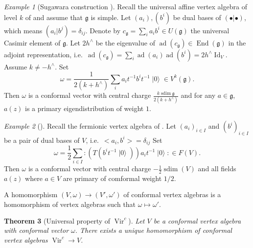 \documentclass[a4paper, 12pt, reqno]{amsart}
\newtheorem{theorem}{Theorem}[subsection]
\theoremstyle{remark}
\newtheorem{example}[theorem]{Example}
\numberwithin{equation}{subsection}
\DeclareMathOperator{\Vir}{Vir}
\DeclareMathOperator{\Id}{Id}
\DeclareMathOperator{\End}{End}
\DeclareMathOperator{\vac}{|0\rangle}
\DeclareMathOperator{\ad}{ad}
\DeclareMathOperator{\sdim}{sdim}
\begin{document}
\begin{example}[Sugawara construction {\cite[Theorem 5.7]{kac_vertex_1998}}]
  \label{exa:9}
  Recall the universal affine vertex algebra of level $k$ of  and assume that $\mathfrak{g}$ is simple.
  Let $(a_i), (b^i)$ be dual bases of $(\bullet| \bullet)$, which means $(a_i| b^j) = \delta_{ij}$.
  Denote by $c_{\mathfrak{g}} = \sum_ia_ib^i \in U(\mathfrak{g})$ the universal Casimir element of $\mathfrak{g}$.
  Let $2h^{\wedge}$ be the eigenvalue of $\ad(c_{\mathfrak{g}}) \in \End(\mathfrak{g})$ in the adjoint representation, i.e.\ $\ad(c_{\mathfrak{g}}) = \sum_i\ad(a_i)\ad(b^i) = 2h^{\wedge}\Id_V$. 
  Assume $k \neq -h^\wedge$.
  Set
  \begin{equation*}
    \omega = \frac{1}{2(k + h^\wedge)}\sum_ia_it^{-1}b^it^{-1}\vac \in V^k(\mathfrak{g}).
  \end{equation*}
  Then $\omega$ is a conformal vector with central charge $\frac{k \sdim\mathfrak{g}}{2(k + h^\wedge)}$ and for any $a\in \mathfrak{g}$, $a(z)$ is a primary eigendistribution of weight $1$.
\end{example}

\begin{example}[{\cite[Proposition 4.10]{kac_vertex_1998}}]
  \label{exa:10}
  Recall the fermionic vertex algebra of .
  Let $(a_i)_{i \in I}$ and $(b^i)_{i \in I}$ be a pair of dual bases of $V$, i.e.\ $<a_i, b^i> = \delta_{ij}$
  Set
  \begin{equation*}
    \omega = \frac{1}{2}\sum_{i \in I}:(T(b^it^{-1}\vac))a_it^{-1}\vac:\in F(V).
  \end{equation*}
  Then $\omega$ is a conformal vector with central charge $-\frac{1}{2}\sdim(V)$ and all fields $a(z)$ where $a \in V$ are primary of comformal weight $1/2$.
\end{example}

A homomorphism $(V, \omega) \to (V', \omega')$ of conformal vertex algebras is a homomorphism of vertex algebras such that $\omega \mapsto \omega'$.

\begin{theorem}[Universal property of $\Vir^c$]
  \label{thr:18}
  Let $V$ be a conformal vertex algebra with conformal vector $\omega$.
  There exists a unique homomorphism of conformal vertex algebras $\Vir^c \to V$.
\end{theorem}
\end{document}
